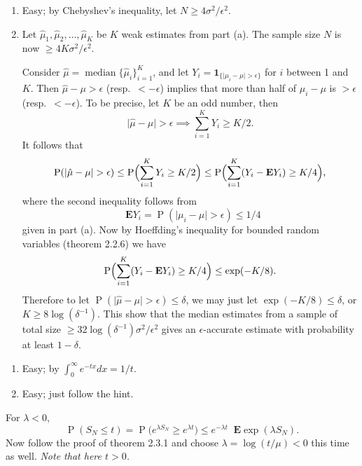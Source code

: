 \documentclass[11pt]{article}
\newcommand{\abs}[1]{\lvert #1 \rvert}
\renewcommand{\Pr}{\operatorname{P}}
\newcommand{\E}{\mathop{}\!\mathbf{E}}
\newcommand{\I}[1]{\mathbf{1}_{\{#1\}}}
\theoremstyle{plain}
\theoremstyle{definition}
\theoremstyle{remark}
\theoremstyle{definition}
\newenvironment{mansol}[1]{%
  \renewcommand\themansolinner{#1}%
  \mansolinner
}{\endmansolinner}
\begin{document}
\begin{mansol}{2.2.9}
\begin{enumerate}[label=(\alph*)]
    \item Easy; by Chebyshev's inequality, let $N \geq 4 \sigma^2 / \epsilon^2$.
    \item Let $\hat{\mu}_1,\hat{\mu}_2,\ldots,\hat{\mu}_K$ be $K$ weak estimates from part (a). The sample size $N$ is now $\geq 4K \sigma^2/\epsilon^2$.

    Consider $\hat \mu = \operatorname{median}\{\hat \mu_i\}_{i=1}^K$, and let $Y_i = \I{\abs{\mu_i - \mu} > \epsilon}$ for $i$ between 1 and $K$. Then $\hat \mu - \mu > \epsilon$ (resp.\ $< -\epsilon$) implies that more than half of $\mu_i - \mu$ is $> \epsilon$ (resp.\ $< -\epsilon$). To be precise, let $K$ be an odd number, then \[\abs{\hat\mu - \mu} > \epsilon \implies \sum_{i=1}^K Y_i \geq K/2.\] It follows that \[
        \Pr(\abs{\hat \mu - \mu} > \epsilon) \leq \Pr\Bigl(\sum_{i=1}^K Y_i \geq K/2\Bigr) \leq \Pr\Bigl(\sum_{i=1}^K (Y_i - \E Y_i) \geq K/4\Bigr),
    \]
    where the second inequality follows from \[\E Y_i = \Pr(\abs{\mu_i - \mu} > \epsilon) \leq 1/4\] given in part (a). Now by Hoeffding's inequality for bounded random variables (theorem 2.2.6) we have \[
    \Pr\Bigl(\sum_{i=1}^K (Y_i - \E Y_i) \geq K/4\Bigr) \leq \exp(- K / 8).
    \]
    Therefore to let $\Pr(\abs{\hat \mu - \mu} > \epsilon) \leq \delta$, we may just let $\exp(- K / 8) \leq \delta$, or $K \geq 8 \log(\delta^{-1})$. This show that the median estimates from a sample of total size $\geq 32 \log(\delta^{-1}) \sigma^2/\epsilon^2$ gives an $\epsilon$-accurate estimate with probability at least $1-\delta$.
\end{enumerate}
\end{mansol}

\begin{mansol}{2.2.10}
\begin{enumerate}[label=(\alph*)]
\item Easy; by $\int_0^\infty e^{-tx} dx = 1/t$.
\item Easy; just follow the hint.
\end{enumerate}
\end{mansol}

\begin{mansol}{2.3.2}
For $\lambda < 0$, \[\Pr(S_N \leq t) = \Pr\bigl(e^{\lambda S_N} \geq e^{\lambda t}\bigr) \leq e^{-\lambda t} \E \exp(\lambda S_N).\]
Now follow the proof of theorem 2.3.1 and choose $\lambda = \log(t/\mu) < 0$ this time as well. \textit{Note that here $t > 0$.}
\end{mansol}
\end{document}
